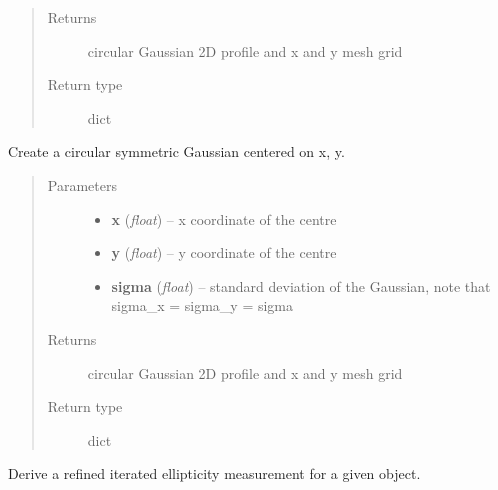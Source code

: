 \documentclass[a4paper,11pt,english]{sphinxmanual}
\begin{document}
\begin{fulllineitems}
\begin{fulllineitems}
\begin{quote}
\begin{description}
\item[{Returns}] \leavevmode
circular Gaussian 2D profile and x and y mesh grid

\item[{Return type}] \leavevmode
dict

\end{description}\end{quote}

\end{fulllineitems}


\begin{fulllineitems}
\label{analysis:analysis.shape.shapeMeasurement.circular2DGaussian}
Create a circular symmetric Gaussian centered on x, y.
\begin{quote}\begin{description}
\item[{Parameters}] \leavevmode\begin{itemize}
\item {} 
\textbf{x} (\emph{float}) -- x coordinate of the centre

\item {} 
\textbf{y} (\emph{float}) -- y coordinate of the centre

\item {} 
\textbf{sigma} (\emph{float}) -- standard deviation of the Gaussian, note that sigma\_x = sigma\_y = sigma

\end{itemize}

\item[{Returns}] \leavevmode
circular Gaussian 2D profile and x and y mesh grid

\item[{Return type}] \leavevmode
dict

\end{description}\end{quote}

\end{fulllineitems}


\begin{fulllineitems}
\label{analysis:analysis.shape.shapeMeasurement.measureRefinedEllipticity}
Derive a refined iterated ellipticity measurement for a given object.


\end{fulllineitems}
\end{fulllineitems}
\end{document}
